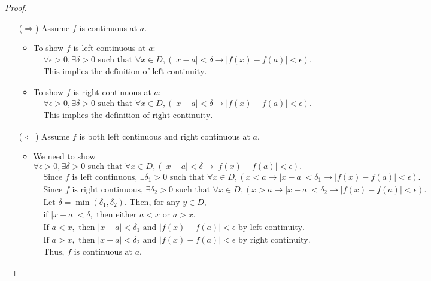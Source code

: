 \begin{proof}~\newline
    \begin{itemize}
    \item[($\Rightarrow$)] Assume $f$ is continuous at $a$.
        \begin{itemize}
        \item To show $f$ is left continuous at $a$:
        \begin{align*}
        &\forall \epsilon > 0, \exists \delta > 0 \text{ such that } \forall x \in D, (|x - a| < \delta \rightarrow |f(x) - f(a)| < \epsilon). \\
        & \text{This implies the definition of left continuity.}
        \end{align*}

        \item To show $f$ is right continuous at $a$:
        \begin{align*}
        &\forall \epsilon > 0, \exists \delta > 0 \text{ such that } \forall x \in D, (|x - a| < \delta \rightarrow |f(x) - f(a)| < \epsilon). \\
        & \text{This implies the definition of right continuity.}
        \end{align*}
        \end{itemize}

    \item[($\Leftarrow$)] Assume $f$ is both left continuous and right continuous at $a$.
        \begin{itemize}
        \item We need to show $\forall \epsilon > 0, \exists \delta > 0 \text{ such that } \forall x \in D, (|x - a| < \delta \rightarrow |f(x) - f(a)| < \epsilon).$
        \begin{align*}
        & \text{Since $f$ is left continuous, } \exists \delta_1 > 0 \text{ such that } \forall x \in D, (x < a \rightarrow |x - a| < \delta_1 \rightarrow |f(x) - f(a)| < \epsilon). \\
        & \text{Since $f$ is right continuous, } \exists \delta_2 > 0 \text{ such that } \forall x \in D, (x > a \rightarrow |x - a| < \delta_2 \rightarrow |f(x) - f(a)| < \epsilon). \\
        & \text{Let } \delta = \min(\delta_1, \delta_2). \text{ Then, for any } y \in D, \\
        & \text{if } |x - a| < \delta, \text{ then either } a < x \text{ or } a > x. \\
        & \text{If } a < x, \text{ then } |x - a| < \delta_1 \text{ and } |f(x) - f(a)| < \epsilon \text{ by left continuity.} \\
        & \text{If } a > x, \text{ then } |x - a| < \delta_2 \text{ and } |f(x) - f(a)| < \epsilon \text{ by right continuity.} \\
        & \text{Thus, } f \text{ is continuous at } a.
        \end{align*}
        \end{itemize}
    \end{itemize}
\end{proof}
